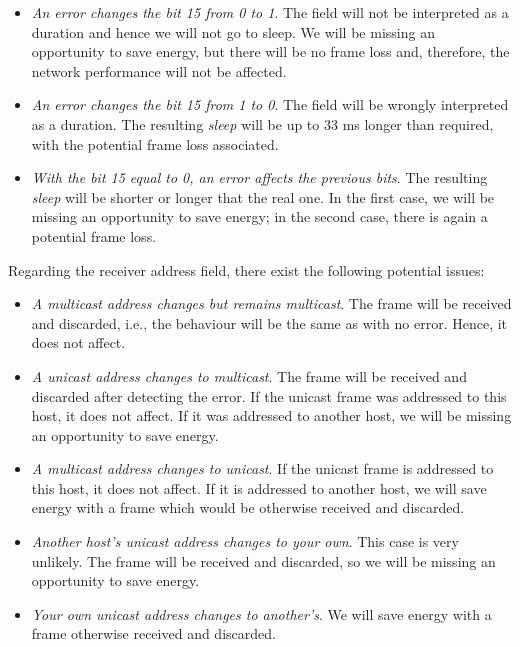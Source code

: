 \documentclass[twoside,nohyper]{tufte-book}
\providecommand{\tightlist}{%
  \setlength{\itemsep}{0pt}\setlength{\parskip}{0pt}}
\theoremstyle{definition}
\theoremstyle{definition}
\theoremstyle{definition}
\theoremstyle{remark}
\begin{document}
\begin{itemize}
\tightlist
\item
  \emph{An error changes the bit 15 from 0 to 1}. The field will not be
  interpreted as a duration and hence we will not go to sleep. We will
  be missing an opportunity to save energy, but there will be no frame
  loss and, therefore, the network performance will not be affected.
\item
  \emph{An error changes the bit 15 from 1 to 0}. The field will be
  wrongly interpreted as a duration. The resulting \emph{sleep} will be
  up to 33 ms longer than required, with the potential frame loss
  associated.
\item
  \emph{With the bit 15 equal to 0, an error affects the previous bits}.
  The resulting \emph{sleep} will be shorter or longer that the real
  one. In the first case, we will be missing an opportunity to save
  energy; in the second case, there is again a potential frame loss.
\end{itemize}

Regarding the receiver address field, there exist the following
potential issues:

\begin{itemize}
\tightlist
\item
  \emph{A multicast address changes but remains multicast}. The frame
  will be received and discarded, i.e., the behaviour will be the same
  as with no error. Hence, it does not affect.
\item
  \emph{A unicast address changes to multicast}. The frame will be
  received and discarded after detecting the error. If the unicast frame
  was addressed to this host, it does not affect. If it was addressed to
  another host, we will be missing an opportunity to save energy.
\item
  \emph{A multicast address changes to unicast}. If the unicast frame is
  addressed to this host, it does not affect. If it is addressed to
  another host, we will save energy with a frame which would be
  otherwise received and discarded.
\item
  \emph{Another host's unicast address changes to your own}. This case
  is very unlikely. The frame will be received and discarded, so we will
  be missing an opportunity to save energy.
\item
  \emph{Your own unicast address changes to another's}. We will save
  energy with a frame otherwise received and discarded.
\end{itemize}
\end{document}
